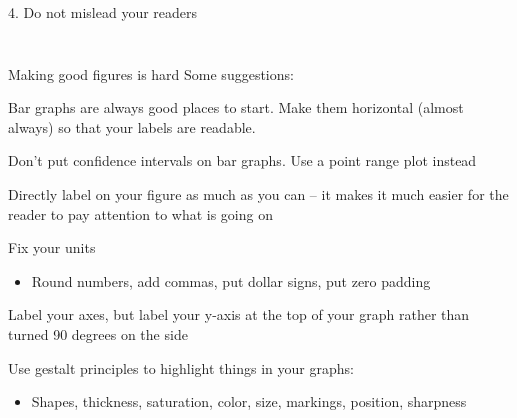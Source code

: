 \documentclass[notes,11pt, aspectratio=169]{beamer}
\newenvironment{wideitemize}{\itemize\addtolength{\itemsep}{10pt}}{\enditemize}
\begin{document}
\begin{frame}{4. Do not mislead your readers}
\begin{columns}[T]
\begin{column}{.4\textwidth}
{      }
  \end{column}
\end{columns}
\end{frame}

\begin{frame}{Making good figures is hard}
  Some suggestions:
  \begin{wideitemize}
  \item Bar graphs are always good places to start. Make them
    horizontal (almost always) so that your labels are readable.
  \item Don't put confidence intervals on bar graphs. Use a point
    range plot instead
  \item Directly label on your figure as much as you can -- it makes
    it much easier for the reader to pay attention to what is going on
  \item Fix your units
    \begin{itemize}
    \item Round numbers, add commas, put dollar signs, put zero
      padding
    \end{itemize}
  \item Label your axes, but label your y-axis at the top of your
    graph rather than turned 90 degrees on the side
  \item Use gestalt principles to highlight things in your graphs:
    \begin{itemize}
    \item Shapes, thickness, saturation, color, size, markings,
      position, sharpness
    \end{itemize}
  \end{wideitemize}
  
\end{frame}
\end{document}
